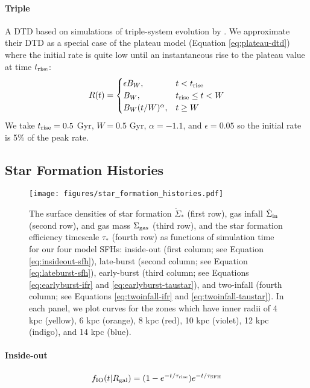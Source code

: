\documentclass[twocolumn,linenumbers,twocolappendix]{aastex631}
\begin{document}
\paragraph{Triple} A DTD based on simulations of triple-system evolution by \citet{Rajamuthukumar2022-TripleEvolution}. We approximate their DTD as a special case of the plateau model (Equation \ref{eq:plateau-dtd}) where the initial rate is quite low until an instantaneous rise to the plateau value at time $t_{\rm rise}$:
\begin{equation}
    R(t) = 
    \begin{cases}
        \epsilon B_W, & t < t_{\rm rise} \\
        B_W, & t_{\rm rise} \leq t < W \\
        B_W (t / W) ^ \alpha, & t \geq W
    \end{cases}
    \label{eq:triple-dtd}
\end{equation}
We take $t_{\rm rise}=0.5$ Gyr, $W=0.5$ Gyr, $\alpha=-1.1$, and $\epsilon=0.05$ so the initial rate is 5\% of the peak rate.

\subsection{Star Formation Histories}
\label{sec:sfh}

\begin{figure*}
    \centering
    \texttt{[image: figures/star\_formation\_histories.pdf]}
    \caption{The surface densities of star formation $\dot \Sigma_*$ (first row), gas infall $\dot \Sigma_{\rm in}$ (second row), and gas mass $\Sigma_{\rm gas}$ (third row), and the star formation efficiency timescale $\tau_*$ (fourth row) as functions of simulation time for our four model SFHs: inside-out (first column; see Equation \ref{eq:insideout-sfh}), late-burst (second column; see Equation \ref{eq:lateburst-sfh}), early-burst (third column; see Equations \ref{eq:earlyburst-ifr} and \ref{eq:earlyburst-taustar}), and two-infall (fourth column; see Equations \ref{eq:twoinfall-ifr} and \ref{eq:twoinfall-taustar}). In each panel, we plot curves for the zones which have inner radii of 4 kpc (yellow), 6 kpc (orange), 8 kpc (red), 10 kpc (violet), 12 kpc (indigo), and 14 kpc (blue).}
    \label{fig:sfhs}
\end{figure*}

\paragraph{Inside-out}
\begin{equation}
    f_{\rm IO}(t|R_{\rm gal}) = (1 - e^{-t/\tau_{\rm rise}}) e^{-t/\tau_{\rm SFH}}
    \label{eq:insideout-sfh}
\end{equation}
\end{document}
